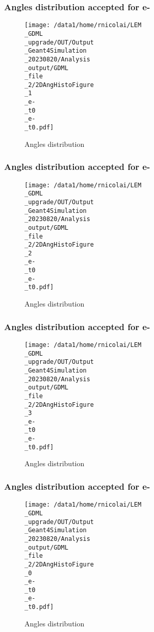 \documentclass[8pt]{beamer}
\begin{document}
            \begin{frame}
                \frametitle{Angles distribution accepted for e-}
            
        \begin{figure}[h]
            \centering
            \texttt{[image: /data1/home/rnicolai/LEM\\\_GDML\\\_upgrade/OUT/Output\\\_Geant4Simulation\\\_20230820/Analysis\\\_output/GDML\\\_file\\\_2/2DAngHistoFigure\\\_1\\\_e-\\\_t0\\\_e-\\\_t0.pdf]}
            \caption{Angles distribution}
        \end{figure}
        
            \end{frame}
            
            \begin{frame}
                \frametitle{Angles distribution accepted for e-}
            
        \begin{figure}[h]
            \centering
            \texttt{[image: /data1/home/rnicolai/LEM\\\_GDML\\\_upgrade/OUT/Output\\\_Geant4Simulation\\\_20230820/Analysis\\\_output/GDML\\\_file\\\_2/2DAngHistoFigure\\\_2\\\_e-\\\_t0\\\_e-\\\_t0.pdf]}
            \caption{Angles distribution}
        \end{figure}
        
            \end{frame}
            
            \begin{frame}
                \frametitle{Angles distribution accepted for e-}
            
        \begin{figure}[h]
            \centering
            \texttt{[image: /data1/home/rnicolai/LEM\\\_GDML\\\_upgrade/OUT/Output\\\_Geant4Simulation\\\_20230820/Analysis\\\_output/GDML\\\_file\\\_2/2DAngHistoFigure\\\_3\\\_e-\\\_t0\\\_e-\\\_t0.pdf]}
            \caption{Angles distribution}
        \end{figure}
        
            \end{frame}
            
            \begin{frame}
                \frametitle{Angles distribution accepted for e-}
            
        \begin{figure}[h]
            \centering
            \texttt{[image: /data1/home/rnicolai/LEM\\\_GDML\\\_upgrade/OUT/Output\\\_Geant4Simulation\\\_20230820/Analysis\\\_output/GDML\\\_file\\\_2/2DAngHistoFigure\\\_0\\\_e-\\\_t0\\\_e-\\\_t0.pdf]}
            \caption{Angles distribution}
        \end{figure}
        
            \end{frame}
            
\end{document}
